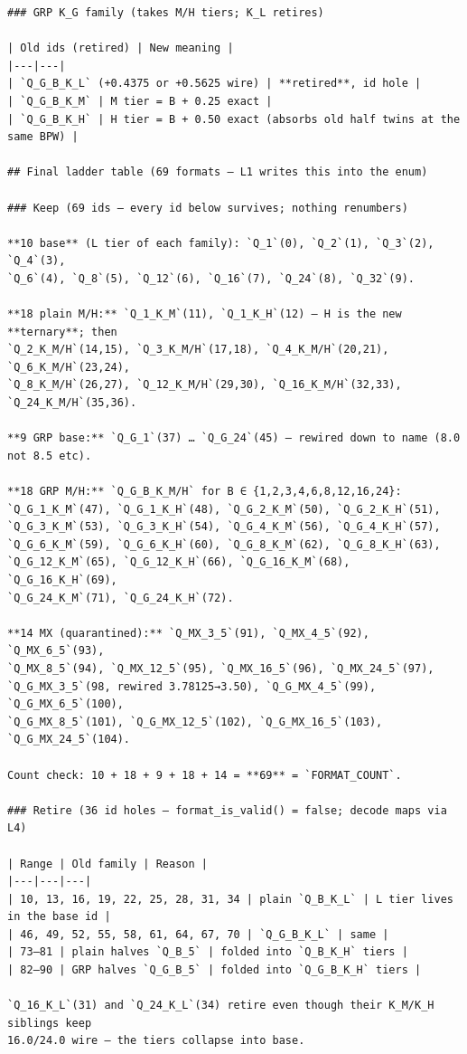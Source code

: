 \begin{Verbatim}[breaklines,breakanywhere,fontsize=\footnotesize]
### GRP K_G family (takes M/H tiers; K_L retires)

| Old ids (retired) | New meaning |
|---|---|
| `Q_G_B_K_L` (+0.4375 or +0.5625 wire) | **retired**, id hole |
| `Q_G_B_K_M` | M tier = B + 0.25 exact |
| `Q_G_B_K_H` | H tier = B + 0.50 exact (absorbs old half twins at the same BPW) |

## Final ladder table (69 formats — L1 writes this into the enum)

### Keep (69 ids — every id below survives; nothing renumbers)

**10 base** (L tier of each family): `Q_1`(0), `Q_2`(1), `Q_3`(2), `Q_4`(3),
`Q_6`(4), `Q_8`(5), `Q_12`(6), `Q_16`(7), `Q_24`(8), `Q_32`(9).

**18 plain M/H:** `Q_1_K_M`(11), `Q_1_K_H`(12) — H is the new **ternary**; then
`Q_2_K_M/H`(14,15), `Q_3_K_M/H`(17,18), `Q_4_K_M/H`(20,21), `Q_6_K_M/H`(23,24),
`Q_8_K_M/H`(26,27), `Q_12_K_M/H`(29,30), `Q_16_K_M/H`(32,33), `Q_24_K_M/H`(35,36).

**9 GRP base:** `Q_G_1`(37) … `Q_G_24`(45) — rewired down to name (8.0 not 8.5 etc).

**18 GRP M/H:** `Q_G_B_K_M/H` for B ∈ {1,2,3,4,6,8,12,16,24}:
`Q_G_1_K_M`(47), `Q_G_1_K_H`(48), `Q_G_2_K_M`(50), `Q_G_2_K_H`(51),
`Q_G_3_K_M`(53), `Q_G_3_K_H`(54), `Q_G_4_K_M`(56), `Q_G_4_K_H`(57),
`Q_G_6_K_M`(59), `Q_G_6_K_H`(60), `Q_G_8_K_M`(62), `Q_G_8_K_H`(63),
`Q_G_12_K_M`(65), `Q_G_12_K_H`(66), `Q_G_16_K_M`(68), `Q_G_16_K_H`(69),
`Q_G_24_K_M`(71), `Q_G_24_K_H`(72).

**14 MX (quarantined):** `Q_MX_3_5`(91), `Q_MX_4_5`(92), `Q_MX_6_5`(93),
`Q_MX_8_5`(94), `Q_MX_12_5`(95), `Q_MX_16_5`(96), `Q_MX_24_5`(97),
`Q_G_MX_3_5`(98, rewired 3.78125→3.50), `Q_G_MX_4_5`(99), `Q_G_MX_6_5`(100),
`Q_G_MX_8_5`(101), `Q_G_MX_12_5`(102), `Q_G_MX_16_5`(103), `Q_G_MX_24_5`(104).

Count check: 10 + 18 + 9 + 18 + 14 = **69** = `FORMAT_COUNT`.

### Retire (36 id holes — format_is_valid() = false; decode maps via L4)

| Range | Old family | Reason |
|---|---|---|
| 10, 13, 16, 19, 22, 25, 28, 31, 34 | plain `Q_B_K_L` | L tier lives in the base id |
| 46, 49, 52, 55, 58, 61, 64, 67, 70 | `Q_G_B_K_L` | same |
| 73–81 | plain halves `Q_B_5` | folded into `Q_B_K_H` tiers |
| 82–90 | GRP halves `Q_G_B_5` | folded into `Q_G_B_K_H` tiers |

`Q_16_K_L`(31) and `Q_24_K_L`(34) retire even though their K_M/K_H siblings keep
16.0/24.0 wire — the tiers collapse into base.


\end{Verbatim}
